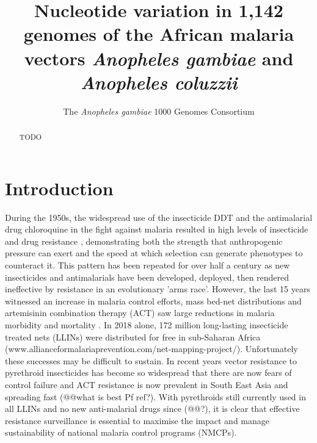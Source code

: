 \documentclass[a4paper,11pt,abstracton,hidelinks]{scrartcl}
\title{
Nucleotide variation in 1,142 genomes of the African malaria vectors \emph{Anopheles gambiae} and \emph{Anopheles coluzzii}
}
\author[1]{\small The \emph{Anopheles gambiae} 1000 Genomes Consortium}
\affil[1]{\footnotesize A list of consortium members appears at the end of the paper}
\begin{document}
\maketitle


\begin{abstract}

TODO

\end{abstract}


\section*{Introduction}


During the 1950s, the widespread use of the insecticide DDT and the antimalarial drug chloroquine in the fight against malaria resulted in high levels of insecticide and drug resistance \cite{hemingway2000, trape2001}, demonstrating both the strength that anthropogenic pressure can exert and the speed at which selection can generate phenotypes to counteract it.
%
This pattern has been repeated for over half a century as new insecticides and antimalarials have been developed, deployed, then rendered ineffective by resistance in an evolutionary 'arms race'.
%
However, the last 15 years witnessed an increase in malaria control efforts, mass bed-net distributions and artemisinin combination therapy (ACT) saw large reductions in malaria morbidity and mortality \cite{Bhatt2015}.
%
In 2018 alone, 172 million long-lasting insecticide treated nets (LLINs) were distributed for free in sub-Saharan Africa (www.allianceformalariaprevention.com/net-mapping-project/).
%
Unfortunately these successes may be difficult to sustain.
%
In recent years vector resistance to pyrethroid insecticides has become so widespread that there are now fears of control failure \cite{churcher2016, Hemingway2016} and ACT resistance is now prevalent in South East Asia and spreading fast (@@what is best Pf ref?).
%
With pyrethroids still currently used in all LLINs and no new anti-malarial drugs since (@@?), it is clear that effective resistance surveillance is essential to maximise the impact and manage sustainability of national malaria control programs (NMCPs). 
\end{document}
